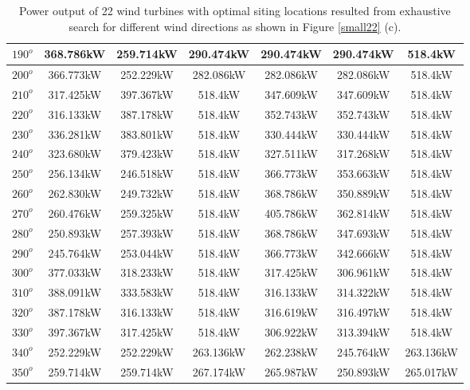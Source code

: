 \begin{table}[H]
\begin{tabular}{|c|c|c|c|c|c|c|}
		$190^o$	& 368.786kW	& 259.714kW	& 290.474kW	& 290.474kW	& 290.474kW	& 518.4kW	\\ \hline
		$200^o$	& 366.773kW	& 252.229kW	& 282.086kW	& 282.086kW	& 282.086kW	& 518.4kW	\\ \hline
		$210^o$	& 317.425kW	& 397.367kW	& 518.4kW	& 347.609kW	& 347.609kW	& 518.4kW	\\ \hline
		$220^o$	& 316.133kW	& 387.178kW	& 518.4kW	& 352.743kW	& 352.743kW	& 518.4kW	\\ \hline
		$230^o$	& 336.281kW	& 383.801kW	& 518.4kW	& 330.444kW	& 330.444kW	& 518.4kW	\\ \hline
		$240^o$	& 323.680kW	& 379.423kW	& 518.4kW	& 327.511kW	& 317.268kW	& 518.4kW	\\ \hline
		$250^o$	& 256.134kW	& 246.518kW	& 518.4kW	& 366.773kW	& 353.663kW	& 518.4kW	\\ \hline
		$260^o$	& 262.830kW	& 249.732kW	& 518.4kW	& 368.786kW	& 350.889kW	& 518.4kW	\\ \hline
		$270^o$	& 260.476kW	& 259.325kW	& 518.4kW	& 405.786kW	& 362.814kW	& 518.4kW	\\ \hline
		$280^o$	& 250.893kW	& 257.393kW	& 518.4kW	& 368.786kW	& 347.693kW	& 518.4kW	\\ \hline
		$290^o$	& 245.764kW	& 253.044kW	& 518.4kW	& 366.773kW	& 342.666kW	& 518.4kW	\\ \hline
		$300^o$	& 377.033kW	& 318.233kW	& 518.4kW	& 317.425kW	& 306.961kW	& 518.4kW	\\ \hline
		$310^o$	& 388.091kW	& 333.583kW	& 518.4kW	& 316.133kW	& 314.322kW	& 518.4kW	\\ \hline
		$320^o$	& 387.178kW	& 316.133kW	& 518.4kW	& 316.619kW	& 316.497kW	& 518.4kW	\\ \hline
		$330^o$	& 397.367kW	& 317.425kW	& 518.4kW	& 306.922kW	& 313.394kW	& 518.4kW	\\ \hline
		$340^o$	& 252.229kW	& 252.229kW	& 263.136kW	& 262.238kW	& 245.764kW	& 263.136kW	\\ \hline
		$350^o$	& 259.714kW	& 259.714kW	& 267.174kW	& 265.987kW	& 250.893kW	& 265.017kW	\\ \hline

        	\end{tabular}
        	\caption{Power output of 22 wind turbines with optimal siting locations resulted from exhaustive search for different wind directions as shown in Figure \ref{small22} (c).}
        	\label{table22c}
        \end{table}
